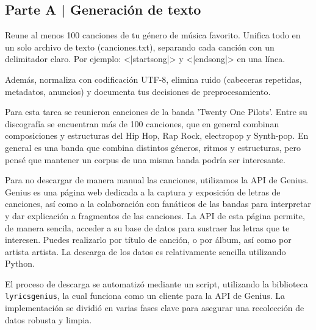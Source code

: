 \newpage

\begin{myblock}
\section*{Parte A | Generación de texto}

    Reune al menos 100 canciones de tu género de música favorito. Unifica todo en un 
    solo archivo de texto (canciones.txt), separando cada canción con un delimitador claro. 
    Por ejemplo: <|startsong|> y <|endsong|> en una línea. 

    Además, normaliza con codificación UTF-8, elimina ruido (cabeceras repetidas, metadatos, 
    anuncios) y documenta tus decisiones de preprocesamiento.

\end{myblock}



Para esta tarea se reunieron canciones de la banda 'Twenty One Pilots'. Entre su discografía
se encuentran más de 100 canciones, que en general combinan composiciones y estructuras
del Hip Hop, Rap Rock, electropop y Synth-pop. En general es una banda que combina distintos
géneros, ritmos y estructuras, pero pensé que mantener un corpus de una misma banda podría
ser interesante. 

Para no descargar de manera manual las canciones, utilizamos la API de Genius. Genius es una 
página web dedicada a la captura y exposición de letras de canciones, así como a la colaboración
con fanáticos de las bandas para interpretar y dar explicación a fragmentos de las canciones. La
API de esta página permite, de manera sencila, acceder a su base de datos para sustraer las
letras que te interesen. Puedes realizarlo por título de canción, o por álbum, así como por artista
artista. La descarga de los datos es relativamente sencilla utilizando Python. 

El proceso de descarga se automatizó mediante un script, utilizando la biblioteca \texttt{lyricsgenius},
la cual funciona como un cliente para la API de Genius. La implementación se dividió en varias
fases clave para asegurar una recolección de datos robusta y limpia. 

